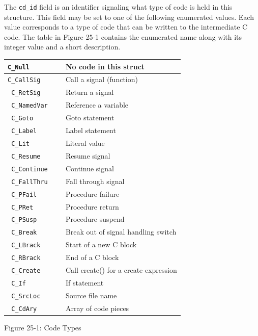 The \texttt{cd\_id} field is an identifier signaling what type of code
is held in this structure. This field may be set to one of the
following enumerated values. Each value corresponds to a type of code
that can be written to the intermediate C code. The table in Figure
25-1 contains the enumerated name along with its integer value and a
short description.

\begin{center}
\tabletail{}
\tablelasttail{}
\begin{xtabular}{|>{\texttt\bgroup}m{1in}<{\egroup}|m{0.5in}|m{2.5in}|}
\hline
C\_Null &
 &
 No code in this struct\\\hline
C\_CallSig &
 &
 Call a signal (function)\\\hline
 C\_RetSig &
 &
 Return a signal\\\hline
 C\_NamedVar &
 &
 Reference a variable\\\hline
 C\_Goto &
 &
 Goto statement\\\hline
 C\_Label &
 &
 Label statement\\\hline
 C\_Lit &
 &
 Literal value\\\hline
 C\_Resume &
 &
 Resume signal\\\hline
 C\_Continue &
 &
 Continue signal\\\hline
 C\_FallThru &
 &
 Fall through signal\\\hline
 C\_PFail &
 &
 Procedure failure\\\hline
 C\_PRet &
 &
 Procedure return\\\hline
 C\_PSusp &
 &
 Procedure suspend\\\hline
 C\_Break &
 &
 Break out of signal handling switch\\\hline
 C\_LBrack &
 &
 Start of a new C block\\\hline
 C\_RBrack &
 &
 End of a C block\\\hline
 C\_Create &
 &
 Call create() for a create expression\\\hline
 C\_If &
 &
 If statement\\\hline
 C\_SrcLoc &
 &
 Source file name\\\hline
 C\_CdAry &
 &
 Array of code pieces\\\hline
\end{xtabular}
\end{center}
{\centering{}
Figure 25-1: Code Types
\par}


